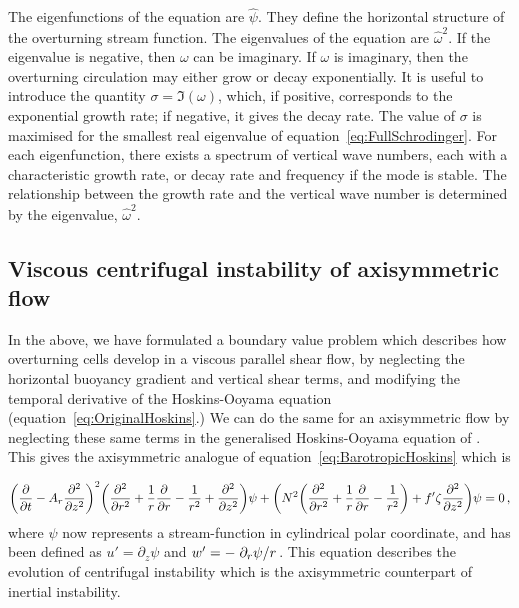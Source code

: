 The eigenfunctions of the equation are $\hat{\psi}$. They define the horizontal structure of the overturning stream function. The eigenvalues of the equation are $\hat{\omega}^2$. If the eigenvalue is negative, then $\omega$ can be imaginary. If $\omega$ is imaginary, then the overturning circulation may either grow or decay exponentially. It is useful to introduce the quantity $\sigma = \Im(\omega)$, which, if positive, corresponds to the exponential growth rate; if negative, it gives the decay rate. The value of $\sigma$ is maximised for the smallest real eigenvalue of equation~\ref{eq:FullSchrodinger}. For each eigenfunction, there exists a spectrum of vertical wave numbers, each with a characteristic growth rate, or decay rate and frequency if the mode is stable\footnotemark. The relationship between the growth rate and the vertical wave number is determined by the eigenvalue, $\hat{\omega}^2$.


\subsection{Viscous centrifugal instability of axisymmetric flow}
In the above, we have formulated a boundary value problem which describes how overturning cells develop in a viscous parallel shear flow, by neglecting the horizontal buoyancy gradient and vertical shear terms, and modifying the temporal derivative of the Hoskins-Ooyama equation (equation~\ref{eq:OriginalHoskins}.) We can do the same for an axisymmetric flow by neglecting these same terms in the generalised Hoskins-Ooyama equation of \citet{Buckingham2021}. This gives the axisymmetric analogue of equation~\ref{eq:BarotropicHoskins} which is

\begin{equation}
    \label{eq:BarotropicBuckingham}
    \bigg(\pdv{}{t} - A_r \pdv[2]{}{z} \bigg)^2 \bigg(\pdv[2]{}{r} + \frac{1}{r}\pdv{}{r} - \frac{1}{r^2} + \pdv[2]{}{z} \bigg) \psi + \bigg( N^2 \bigg(\pdv[2]{}{r} + \frac{1}{r}\pdv{}{r} - \frac{1}{r^2}\bigg) + f' \zeta \pdv[2]{}{z} \bigg) \psi = 0 \, ,
\end{equation}
where $\psi$ now represents a stream-function in cylindrical polar coordinate, and has been defined as $u' = \partial_z \psi$ and $w' = - \flatfrac{\partial_r \psi}{r}$. This equation describes the evolution of centrifugal instability which is the axisymmetric counterpart of inertial instability.

